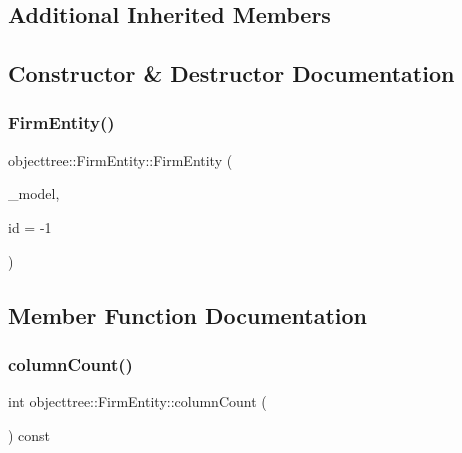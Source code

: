 \subsection*{Additional Inherited Members}


\subsection{Constructor \& Destructor Documentation}
\mbox{\label{classobjecttree_1_1_firm_entity_a24d42d2b14b36ded0c98df1feff267a0}} 
\subsubsection{\texorpdfstring{FirmEntity()}{FirmEntity()}}
{\footnotesize\ttfamily objecttree\+::\+Firm\+Entity\+::\+Firm\+Entity (\begin{DoxyParamCaption}\item[{\mbox{\hyperlink{class_object_tree_model}{Object\+Tree\+Model}} $\ast$}]{\+\_\+model,  }\item[{int}]{id = {\ttfamily -\/1} }\end{DoxyParamCaption})}



\subsection{Member Function Documentation}
\mbox{\label{classobjecttree_1_1_firm_entity_a814fda01c51f85c1a7f420245a573927}} 
\subsubsection{\texorpdfstring{columnCount()}{columnCount()}}
{\footnotesize\ttfamily int objecttree\+::\+Firm\+Entity\+::column\+Count (\begin{DoxyParamCaption}{ }\end{DoxyParamCaption}) const\hspace{0.3cm}{\ttfamily [virtual]}}



